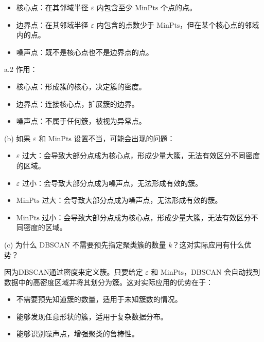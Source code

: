 \documentclass[8pt]{article}
\begin{document}
\begin{itemize}
    \item 核心点：在其邻域半径 \( \varepsilon \) 内包含至少 \( \text{MinPts} \) 个点的点。
    \item 边界点：在其邻域半径 \( \varepsilon \) 内包含的点数少于 \( \text{MinPts} \)，但在某个核心点的邻域内的点。
    \item 噪声点：既不是核心点也不是边界点的点。
\end{itemize}

a.2 作用：

\begin{itemize}
    \item 核心点：形成簇的核心，决定簇的密度。
    \item 边界点：连接核心点，扩展簇的边界。
    \item 噪声点：不属于任何簇，被视为异常点。
\end{itemize}

(b) 如果 \( \varepsilon \) 和 \( \text{MinPts} \) 设置不当，可能会出现的问题：

\begin{itemize}
    \item \( \varepsilon \) 过大：会导致大部分点成为核心点，形成少量大簇，无法有效区分不同密度的区域。
    \item \( \varepsilon \) 过小：会导致大部分点成为噪声点，无法形成有效的簇。
    \item \( \text{MinPts} \) 过大：会导致大部分点成为噪声点，无法形成有效的簇。
    \item \( \text{MinPts} \) 过小：会导致大部分点成为核心点，形成少量大簇，无法有效区分不同密度的区域。
\end{itemize}

(c) 为什么 DBSCAN 不需要预先指定聚类簇的数量 \( k \)？这对实际应用有什么优势？

因为DBSCAN通过密度来定义簇。只要给定 \( \varepsilon \) 和 \( \text{MinPts} \)，DBSCAN 会自动找到数据中的高密度区域并将其划分为簇。这对实际应用的优势在于：

\begin{itemize}
    \item 不需要预先知道簇的数量，适用于未知簇数的情况。
    \item 能够发现任意形状的簇，适用于复杂数据分布。
    \item 能够识别噪声点，增强聚类的鲁棒性。
\end{itemize}

\vspace{3em}
\end{document}
